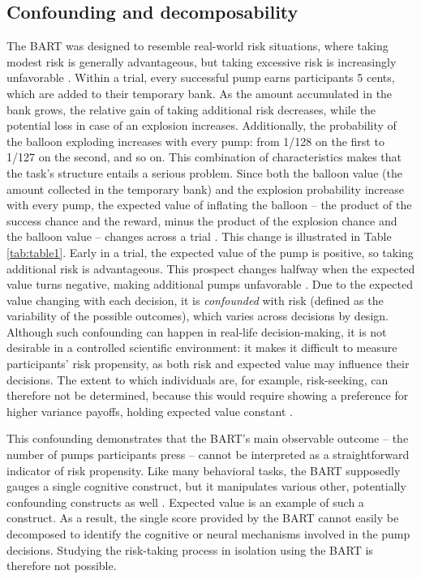 \documentclass[serif, twocolumn, authordate, meta]{jote-article}
\begin{document}
{}
\subsection*{Confounding and decomposability}
\label{sec:confounding}

The BART was designed to resemble real-world risk situations, where taking modest risk is generally advantageous, but taking excessive risk is increasingly unfavorable \parencite{Lejuez2002,Wallsten2005}. Within a trial, every successful pump earns participants 5 cents, which are added to their temporary bank. As the amount accumulated in the bank grows, the relative gain of taking additional risk decreases, while the potential loss in case of an explosion increases. Additionally, the probability of the balloon exploding increases with every pump: from 1/128 on the first to 1/127 on the second, and so on.
\label{sec:confoundingp2}
This combination of characteristics makes that the task's structure entails a serious problem. Since both the balloon value (the amount collected in the temporary bank) and the explosion probability increase with every pump, the expected value of inflating the balloon -- the product of the success chance and the reward, minus the product of the explosion chance and the balloon value -- changes across a trial \parencite{Schmidt2019}. This change is illustrated in Table \ref{tab:table1}. Early in a trial, the expected value of the pump is positive, so taking additional risk is advantageous. This prospect changes halfway when the expected value turns negative, making additional pumps unfavorable \parencite{Lejuez2002}. Due to the expected value changing with each decision, it is \emph{confounded} with risk (defined as the variability of the possible outcomes), which varies across decisions by design. Although such confounding can happen in real-life decision-making, it is not desirable in a controlled scientific environment: it makes it difficult to measure participants' risk propensity, as both risk and expected value may influence their decisions. The extent to which individuals are, for example, risk-seeking, can therefore not be determined, because this would require showing a preference for higher variance payoffs, holding expected value constant \parencite{Schonberg2011}.

This confounding demonstrates that the BART's main observable outcome -- the number of pumps participants press -- cannot be interpreted as a straightforward indicator of risk propensity. Like many behavioral tasks, the BART supposedly gauges a single cognitive construct, but it manipulates various other, potentially confounding constructs as well \parencite{Schonberg2011}. Expected value is an example of such a construct. As a result, the single score provided by the BART cannot easily be decomposed to identify the cognitive or neural mechanisms involved in the pump decisions. Studying the risk-taking process in isolation using the BART is therefore not possible.
\end{document}
